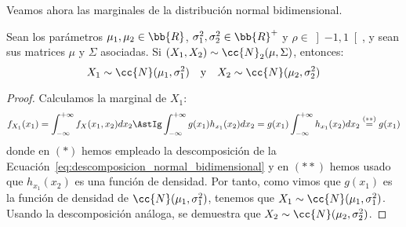 Veamos ahora las marginales de la distribución normal bidimensional.
\begin{prop}
    Sean los parámetros $\mu_1, \mu_2\in \bb{R}$, $\sigma_1^2, \sigma_2^2\in \bb{R}^+$ y $\rho\in \left]-1,1\right[$, y sean sus matrices $\mu$ y $\Sigma$ asociadas.
    Si $(X_1, X_2)\sim \cc{N}_2(\mu, \Sigma)$, entonces:
    \begin{equation*}
        X_1\sim \cc{N}(\mu_1, \sigma_1^2)\quad \text{y}\quad X_2\sim \cc{N}(\mu_2, \sigma_2^2)
    \end{equation*}
\end{prop}
\begin{proof}
    Calculamos la marginal de $X_1$:
    \begin{equation*}
        f_{X_1}(x_1)=\int_{-\infty}^{+\infty} f_X(x_1,x_2)dx_2
        \AstIg \int_{-\infty}^{+\infty} g(x_1)h_{x_1}(x_2)dx_2
        = g(x_1)\int_{-\infty}^{+\infty} h_{x_1}(x_2)dx_2
        \stackrel{(\ast\ast)}{=} g(x_1)
    \end{equation*}
    donde en $(\ast)$ hemos empleado la descomposición de la Ecuación~\ref{eq:descomposicion_normal_bidimensional} y en $(\ast\ast)$ hemos usado que $h_{x_1}(x_2)$ es una función de densidad.
    Por tanto, como vimos que $g(x_1)$ es la función de densidad de $\cc{N}(\mu_1, \sigma_1^2)$, tenemos que $X_1\sim \cc{N}(\mu_1, \sigma_1^2)$.
    Usando la descomposición análoga, se demuestra que $X_2\sim \cc{N}(\mu_2, \sigma_2^2)$.
\end{proof}

